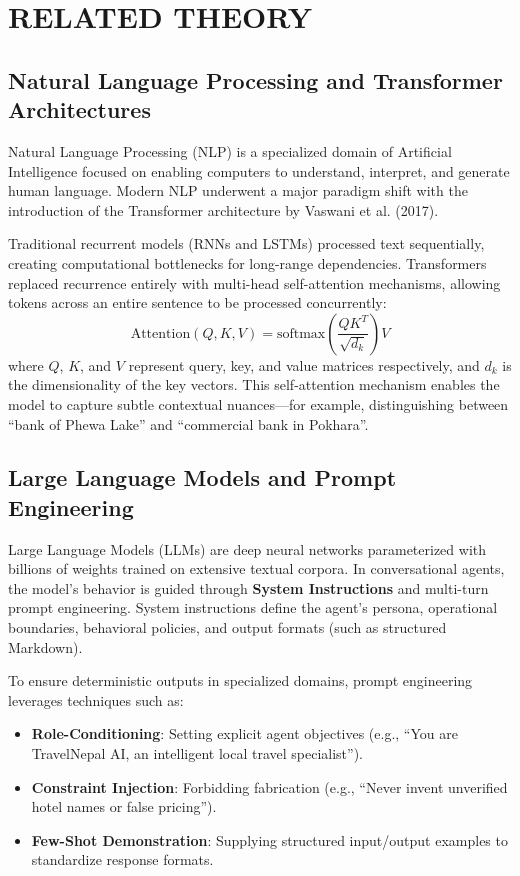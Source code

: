 \documentclass[12pt,a4paper]{report}
\begin{document}
\chapter{RELATED THEORY}

\section{Natural Language Processing and Transformer Architectures}
Natural Language Processing (NLP) is a specialized domain of Artificial Intelligence focused on enabling computers to understand, interpret, and generate human language. Modern NLP underwent a major paradigm shift with the introduction of the Transformer architecture by Vaswani et al. (2017). 

Traditional recurrent models (RNNs and LSTMs) processed text sequentially, creating computational bottlenecks for long-range dependencies. Transformers replaced recurrence entirely with multi-head self-attention mechanisms, allowing tokens across an entire sentence to be processed concurrently:
\begin{equation}
    \text{Attention}(Q, K, V) = \text{softmax}\left(\frac{QK^T}{\sqrt{d_k}}\right)V
\end{equation}
where $Q$, $K$, and $V$ represent query, key, and value matrices respectively, and $d_k$ is the dimensionality of the key vectors. This self-attention mechanism enables the model to capture subtle contextual nuances—for example, distinguishing between ``bank of Phewa Lake'' and ``commercial bank in Pokhara''.

\section{Large Language Models and Prompt Engineering}
Large Language Models (LLMs) are deep neural networks parameterized with billions of weights trained on extensive textual corpora. In conversational agents, the model's behavior is guided through \textbf{System Instructions} and multi-turn prompt engineering. System instructions define the agent's persona, operational boundaries, behavioral policies, and output formats (such as structured Markdown).

To ensure deterministic outputs in specialized domains, prompt engineering leverages techniques such as:
\begin{itemize}
    \item \textbf{Role-Conditioning}: Setting explicit agent objectives (e.g., ``You are TravelNepal AI, an intelligent local travel specialist'').
    \item \textbf{Constraint Injection}: Forbidding fabrication (e.g., ``Never invent unverified hotel names or false pricing'').
    \item \textbf{Few-Shot Demonstration}: Supplying structured input/output examples to standardize response formats.
\end{itemize}
\end{document}
